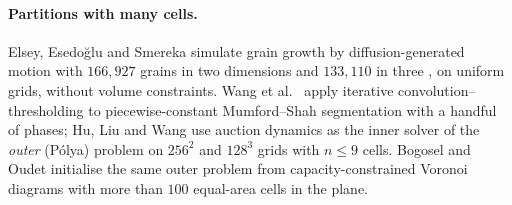 \documentclass[11pt,a4paper]{article}
\begin{document}
\paragraph{Partitions with many cells.} Elsey, Esedo\u{g}lu and Smereka simulate
grain growth by diffusion-generated motion with $166{,}927$ grains in two
dimensions \cite{elsey2009grain} and $133{,}110$ in three \cite{elsey2011large},
on uniform grids, without volume constraints. Wang et al.\
\cite{wang2017thresholding} apply iterative convolution--thresholding to
piecewise-constant Mumford--Shah segmentation with a handful of phases; Hu, Liu
and Wang \cite{hu2024iterative} use auction dynamics as the inner solver of the
\emph{outer} (P\'olya) problem on $256^2$ and $128^3$ grids with $n \le 9$ cells.
Bogosel and Oudet \cite{bogosel2021longest} initialise the same outer problem
from capacity-constrained Voronoi diagrams with more than $100$ equal-area cells
in the plane.
\end{document}
